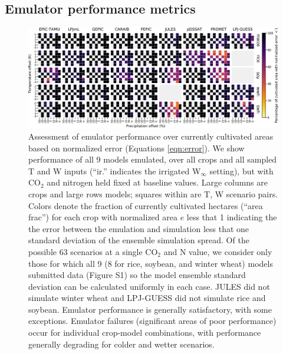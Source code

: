 \documentclass[gmd, manuscript]{copernicus} %
\begin{document}
\subsection{Emulator performance metrics}
\label{S:4.1}
\begin{figure}[ht]
\centering
    \includegraphics[width=16.3cm]{figures/error_grid.png}
    \caption{
    Assessment of emulator performance over currently cultivated areas based on normalized error (Equations \ref{eqn:error}). 
    We show performance of all 9 models emulated, over all crops and all sampled T and W inputs (``ir.'' indicates the irrigated W$_{\infty}$ setting), but with CO$_2$ and nitrogen held fixed at baseline values. 
    Large columns are crops and large rows models; squares within are T, W scenario pairs. 
    Colors denote the fraction of currently cultivated hectares (``area frac'') for each crop with normalized area $e$ less that 1 indicating the the error between the emulation and simulation less that one standard deviation of the ensemble simulation spread. 
    Of the possible 63 scenarios at a single CO$_2$ and N value, we consider only those for which all 9 (8 for rice, soybean, and winter wheat) models submitted data (Figure S1) so the model ensemble standard deviation can be calculated uniformly in each case. 
    JULES did not simulate winter wheat and LPJ-GUESS did not simulate rice and soybean. Emulator performance is generally satisfactory, with some exceptions. 
    Emulator failures (significant areas of poor performance) occur for individual crop-model combinations, with performance generally degrading for colder and wetter scenarios.
    }
   \label{fig:error_360}
\end{figure}
\end{document}

